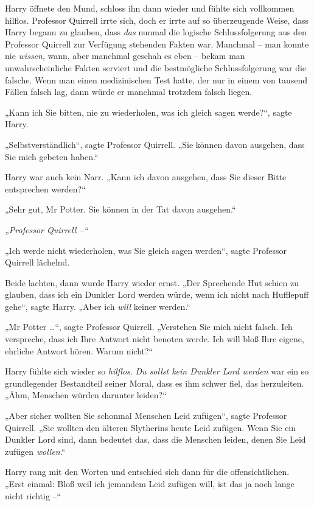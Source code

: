 {Harry öffnete den Mund, schloss ihn dann wieder und fühlte sich vollkommen hilflos. Professor Quirrell irrte sich, doch er irrte auf so überzeugende Weise, dass Harry begann zu glauben, dass \emph{das} nunmal die logische Schlussfolgerung aus den Professor Quirrell zur Verfügung stehenden Fakten war. Manchmal -- man konnte nie \emph{wissen}, wann, aber manchmal geschah es eben -- bekam man unwahrscheinliche Fakten serviert und die bestmögliche Schlussfolgerung war die falsche. Wenn man einen medizinischen Test hatte, der nur in einem von tausend Fällen falsch lag, dann würde er manchmal trotzdem falsch liegen.

„Kann ich Sie bitten, nie zu wiederholen, was ich gleich sagen werde?“, sagte Harry.

„Selbstverständlich“, sagte Professor Quirrell. „Sie können davon ausgehen, dass Sie mich gebeten haben.“

Harry war auch kein Narr. „Kann ich davon ausgehen, dass Sie dieser Bitte entsprechen werden?“

„Sehr gut, Mr Potter. Sie können in der Tat davon ausgehen.“

\emph{„Professor Quirrell --“}

„Ich werde nicht wiederholen, was Sie gleich sagen werden“, sagte Professor Quirrell lächelnd.

Beide lachten, dann wurde Harry wieder ernst. „Der Sprechende Hut schien zu glauben, dass ich ein Dunkler Lord werden würde, wenn ich nicht nach Hufflepuff gehe“, sagte Harry. „Aber ich \emph{will} keiner werden.“

„Mr Potter …“, sagte Professor Quirrell. „Verstehen Sie mich nicht falsch. Ich verspreche, dass ich Ihre Antwort nicht benoten werde. Ich will bloß Ihre eigene, ehrliche Antwort hören. Warum nicht?“

Harry fühlte sich wieder so \emph{hilflos}. \emph{Du sollst kein Dunkler Lord werden} war ein so grundlegender Bestandteil seiner Moral, dass es ihm schwer fiel, das herzuleiten. „Ähm, Menschen würden darunter leiden?“

„Aber sicher wollten Sie schonmal Menschen Leid zufügen“, sagte Professor Quirrell. „Sie wollten den älteren Slytherins heute Leid zufügen. Wenn Sie ein Dunkler Lord sind, dann bedeutet das, dass die Menschen leiden, denen Sie Leid zufügen \emph{wollen}.“

Harry rang mit den Worten und entschied sich dann für die offensichtlichen. „Erst einmal: Bloß weil ich jemandem Leid zufügen will, ist das ja noch lange nicht richtig --“

}
